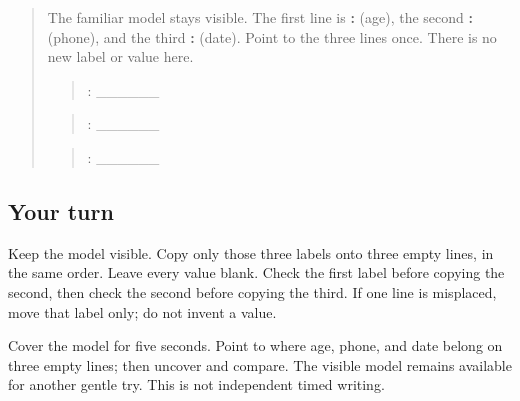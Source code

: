 \label{lesson:PA-R172-form-order-again}



\begin{quote}
The familiar model stays visible. The first line is \textbf{:} (age), the second \textbf{:} (phone), and the third \textbf{:} (date). Point to the three lines once. There is no new label or value here.

\begin{quote}
: \_\_\_\_\_\_
\end{quote}

\begin{quote}
: \_\_\_\_\_\_
\end{quote}

\begin{quote}
: \_\_\_\_\_\_
\end{quote}
\end{quote}

\subsection*{Your turn}
Keep the model visible. Copy only those three labels onto three empty lines, in the same order. Leave every value blank. Check the first label before copying the second, then check the second before copying the third. If one line is misplaced, move that label only; do not invent a value.

\begin{tcolorbox}[breakable,colback=teal!4,colframe=teal!35!black,title={Before you move on}]
Cover the model for five seconds. Point to where age, phone, and date belong on three empty lines; then uncover and compare. The visible model remains available for another gentle try. This is not independent timed writing.
\end{tcolorbox}
